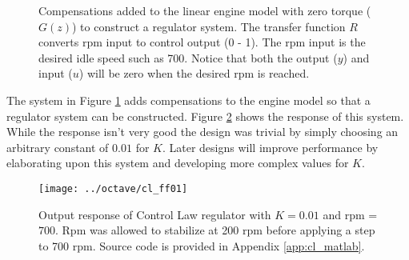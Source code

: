 \documentclass{article}
\begin{document}
\begin{figure}[hpb!]
\begin{center}


\end{center}

\caption{Compensations added to the linear engine model with zero
torque ($G(z)$) to construct a regulator system.
The transfer function $R$ converts rpm input to control output (0 - 1).
The rpm input is the desired idle speed such as 700.
Notice that both the output ($y$) and input ($u$) will be zero when
the desired rpm is reached.}
\label{fig:clid02}
\end{figure}

The system in Figure \ref{fig:clid02} adds compensations to the
engine model so that a regulator system can be constructed.
Figure \ref{fig:cl_plot1} shows the response of this system.
While the response isn't very good the design was trivial
by simply choosing an arbitrary constant of $0.01$ for $K$.
Later designs will improve performance by elaborating upon this
system and developing more complex values for $K$.

\begin{figure}[htbp!]
\begin{center}
\texttt{[image: ../octave/cl\_ff01]}
\end{center}
\caption{Output response of Control Law regulator with $K = 0.01$
and rpm = $700$.
Rpm was allowed to stabilize at 200 rpm before applying a step
to 700 rpm.
Source code is provided in Appendix \ref{app:cl_matlab}.}
\label{fig:cl_plot1}
\end{figure}
\end{document}
